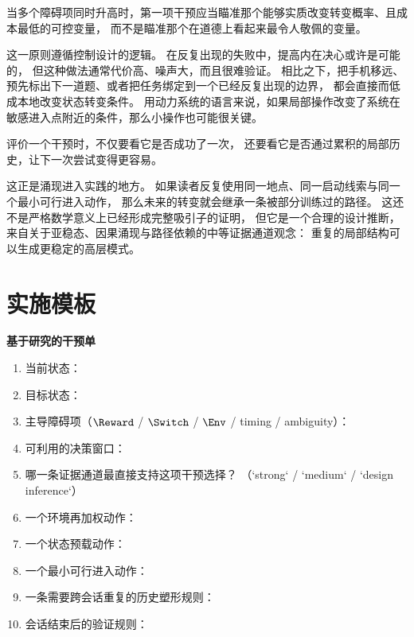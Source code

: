 \begin{proposition}[最便宜可控变量原则]
当多个障碍项同时升高时，第一项干预应当瞄准那个能够实质改变转变概率、且成本最低的可控变量，
而不是瞄准那个在道德上看起来最令人敬佩的变量。
\end{proposition}

\begin{discussion}
这一原则遵循控制设计的逻辑。
在反复出现的失败中，提高内在决心或许是可能的，
但这种做法通常代价高、噪声大，而且很难验证。
相比之下，把手机移远、预先标出下一道题、或者把任务绑定到一个已经反复出现的边界，
都会直接而低成本地改变状态转变条件。
用动力系统的语言来说，如果局部操作改变了系统在敏感进入点附近的条件，那么小操作也可能很关键。
\end{discussion}

\begin{proposition}[历史依赖强化原则]
评价一个干预时，不仅要看它是否成功了一次，
还要看它是否通过累积的局部历史，让下一次尝试变得更容易。
\end{proposition}

\begin{discussion}
这正是涌现进入实践的地方。
如果读者反复使用同一地点、同一启动线索与同一个最小可行进入动作，
那么未来的转变就会继承一条被部分训练过的路径。
这还不是严格数学意义上已经形成完整吸引子的证明，
但它是一个合理的设计推断，来自关于亚稳态、因果涌现与路径依赖的中等证据通道观念：
重复的局部结构可以生成更稳定的高层模式。
\end{discussion}

\section{实施模板}

\begin{templatebox}
\textbf{基于研究的干预单}
\begin{enumerate}[nosep]
  \item 当前状态：
  \item 目标状态：
  \item 主导障碍项（$\Reward$ / $\Switch$ / $\Env$ / timing / ambiguity）：
  \item 可利用的决策窗口：
  \item 哪一条证据通道最直接支持这项干预选择？
        （`strong` / `medium` / `design inference`）
  \item 一个环境再加权动作：
  \item 一个状态预载动作：
  \item 一个最小可行进入动作：
  \item 一条需要跨会话重复的历史塑形规则：
  \item 会话结束后的验证规则：
\end{enumerate}
\end{templatebox}

